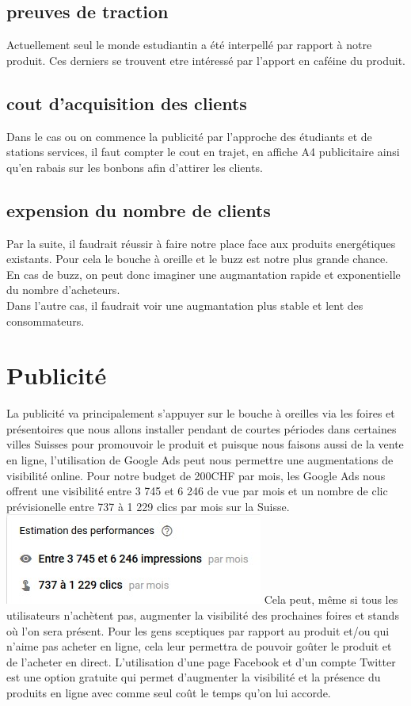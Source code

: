 \documentclass[12pt]{article}
\begin{document}
\subsection{preuves de traction}
Actuellement seul le monde estudiantin a été interpellé par rapport à notre produit. Ces derniers se trouvent etre intéressé par l'apport en caféine du produit.
\subsection{cout d'acquisition des clients}
Dans le cas ou on commence la publicité par l'approche des étudiants et de stations services, il faut compter le cout en trajet, en affiche A4 publicitaire ainsi qu'en rabais sur les bonbons afin d'attirer les clients.

\subsection{expension du nombre de clients}
Par la suite, il faudrait réussir à faire notre place face aux produits energétiques existants. Pour cela le bouche à oreille et le buzz est notre plus grande chance.\\
En cas de buzz, on peut donc imaginer une augmantation rapide et exponentielle du nombre d'acheteurs.\\
Dans l'autre cas, il faudrait voir une augmantation plus stable et lent des consommateurs.

\section{Publicité}
La publicité va principalement s'appuyer sur le bouche à oreilles via les foires et présentoires que nous allons installer pendant de courtes périodes dans certaines villes Suisses pour promouvoir le produit et puisque nous faisons aussi de la vente en ligne, l'utilisation de Google Ads peut nous permettre une augmentations de visibilité online. Pour notre budget de 200CHF par mois, les Google Ads nous offrent une visibilité entre 3 745 et 6 246 de vue par mois et un nombre de clic prévisionelle entre 737 à 1 229 clics par mois sur la Suisse. 
\includegraphics[scale=0.4]{../img/googleAdsPrevision.jpg} 
Cela peut, même si tous les utilisateurs n'achètent pas, augmenter la visibilité des prochaines foires et stands où l'on sera présent. Pour les gens sceptiques par rapport au produit et/ou qui n'aime pas acheter en ligne, cela leur permettra de pouvoir goûter le produit et de l'acheter en direct.
L'utilisation d'une page Facebook et d'un compte Twitter est une option gratuite qui permet d'augmenter la visibilité et la présence du produits en ligne avec comme seul coût le temps qu'on lui accorde. 
\end{document}
